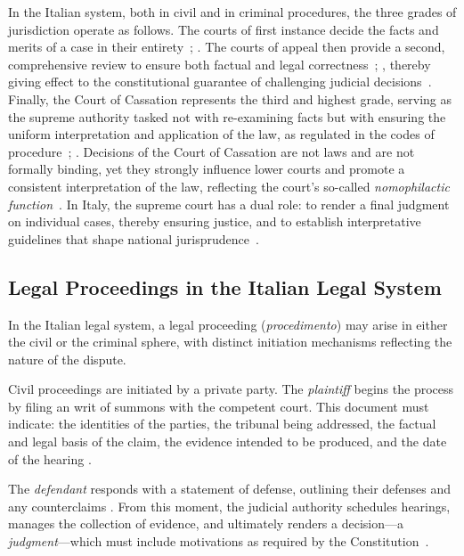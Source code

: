 In the Italian system, both in civil and in criminal procedures, the three grades of jurisdiction operate as follows. The courts of first instance decide the facts and merits of a case in their entirety~\cite[Articles 99--310]{CPC}; \cite[Articles 429--544]{CPP}. The courts of appeal then provide a second, comprehensive review to ensure both factual and legal correctness~\cite[Articles 339--359]{CPC}; \cite[Articles 593--605]{CPP}, thereby giving effect to the constitutional guarantee of challenging judicial decisions~\cite[Article 111]{Costituzione}. Finally, the Court of Cassation represents the third and highest grade, serving as the supreme authority tasked not with re-examining facts but with ensuring the uniform interpretation and application of the law, as regulated in the codes of procedure~\cite[Articles 360--382]{CPC}; \cite[Articles 606--613]{CPP}.
Decisions of the Court of Cassation are not laws and are not formally binding, yet they strongly influence lower courts and promote a consistent interpretation of the law, reflecting the court's so-called \emph{nomophilactic function}~\cite{lazovic2022}. In Italy, the supreme court has a dual role: to render a final judgment on individual cases, thereby ensuring justice, and to establish interpretative guidelines that shape national jurisprudence~\cite[Article 65]{RD1941_12_art65}.


\subsection{Legal Proceedings in the Italian Legal System}

In the Italian legal system, a legal proceeding (\textit{procedimento}) may arise in either the civil or the criminal sphere, with distinct initiation mechanisms reflecting the nature of the dispute.


Civil proceedings are initiated by a private party. The \emph{plaintiff} begins the process by filing an writ of summons with the competent court. This document must indicate: the identities of the parties, the tribunal being addressed, the factual and legal basis of the claim, the evidence intended to be produced, and the date of the hearing \cite[Article 163]{CPC}. 

The \emph{defendant} responds with a statement of defense, outlining their defenses and any counterclaims \cite[Article 167]{CPC}. From this moment, the judicial authority schedules hearings, manages the collection of evidence, and ultimately renders a decision---a \emph{judgment}---which must include motivations as required by the Constitution~\cite[Article 111]{Costituzione}.

